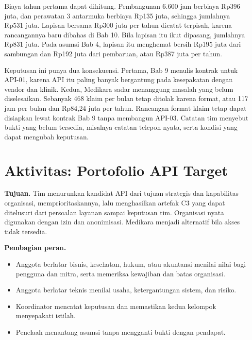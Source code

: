 \begin{kasus}[title={Kasus Medikara Health: Portofolio API Target}]
Biaya tahun pertama dapat dihitung. Pembangunan 6.600 jam berbiaya Rp396 juta, dan perawatan 3 antarmuka berbiaya Rp135 juta, sehingga jumlahnya Rp531 juta.
Lapisan bersama Rp300 juta per tahun dicatat terpisah, karena rancangannya baru dibahas di Bab 10. Bila lapisan itu ikut dipasang, jumlahnya Rp831 juta. Pada
asumsi Bab 4, lapisan itu menghemat bersih Rp195 juta dari sambungan dan Rp192 juta dari pembaruan, atau Rp387 juta per tahun.

Keputusan ini punya dua konsekuensi. Pertama, Bab 9 menulis kontrak untuk API-01, karena API itu paling banyak bergantung pada kesepakatan dengan vendor dan klinik.
Kedua, Medikara sadar menanggung masalah yang belum diselesaikan. Sebanyak 468 klaim per bulan tetap ditolak karena format, atau 117 jam per bulan dan Rp84,24 juta per
tahun. Rancangan format klaim tetap dapat disiapkan lewat kontrak Bab 9 tanpa membangun API-03. Catatan tim menyebut bukti yang belum tersedia, misalnya catatan
telepon nyata, serta kondisi yang dapat mengubah keputusan.
\end{kasus}

\section{Aktivitas: Portofolio API Target}

\textbf{Tujuan.} Tim menurunkan kandidat API dari tujuan strategis dan kapabilitas organisasi, memprioritaskannya, lalu menghasilkan artefak C3 yang dapat ditelusuri dari
persoalan layanan sampai keputusan tim. Organisasi nyata digunakan dengan izin dan anonimisasi. Medikara menjadi alternatif bila akses tidak tersedia.

\textbf{Pembagian peran.}
\begin{itemize}
  \item Anggota berlatar bisnis, kesehatan, hukum, atau akuntansi menilai nilai bagi pengguna dan mitra, serta memeriksa kewajiban dan batas organisasi.
  \item Anggota berlatar teknis menilai usaha, ketergantungan sistem, dan risiko.
  \item Koordinator mencatat keputusan dan memastikan kedua kelompok menyepakati istilah.
  \item Penelaah menantang asumsi tanpa mengganti bukti dengan pendapat.
\end{itemize}

